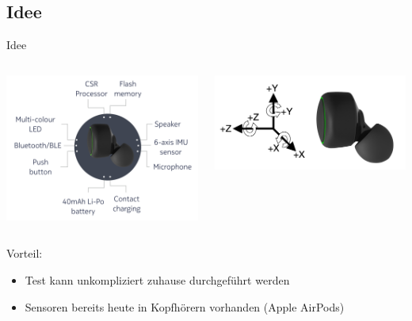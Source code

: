 \documentclass[18pt]{beamer}
\begin{document}
\subsection{Idee}
\begin{frame}{Idee}
    \begin{columns}[T] %
	\begin{column}{.48\textwidth}
	    \includegraphics[scale=0.15]{logos/esense}
	\end{column}%
	\hfill%
	\begin{column}{.48\textwidth}
	    \includegraphics[scale=0.25]{logos/esense2}
	\end{column}%
	\end{columns}
	Vorteil:
	\begin{itemize}
		\item Test kann unkompliziert zuhause durchgeführt werden
		\item Sensoren bereits heute in Kopfhörern vorhanden (Apple AirPods)
	\end{itemize}
\end{frame}
\end{document}
